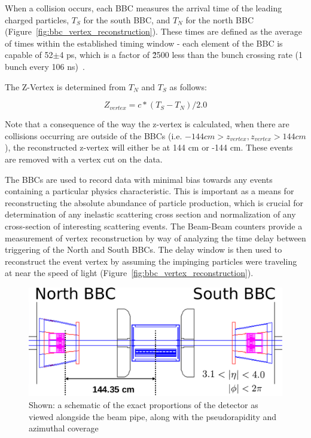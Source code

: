 When a collision occurs, each BBC measures the arrival time of the leading
charged particles, $T_S$ for the south BBC, and $T_N$ for the north BBC
(Figure~\ref{fig:bbc_vertex_reconstruction}). These times are defined as the
average of times within the established timing window - each element of the BBC
is capable of 52$\pm$4 ps, which is a factor of \~2500 less than the bunch
crossing rate (1 bunch every 106 ns)~\cite{Allen2003}.

The Z-Vertex is determined from $T_N$ and $T_S$ as follows:

\begin{equation}
  Z_{vertex} = c * (T_S - T_N) / 2.0
  \label{eq:zvtx_calc}
\end{equation}

{\noindent}Note that a consequence of the way the z-vertex is calculated, when
there are collisions occurring are outside of the BBCs (i.e. $-144 cm >
z_{vertex}, z_{vertex} > 144 cm$), the reconstructed z-vertex will either be at
144 cm or -144 cm.  These events are removed with a vertex cut on the data.

The BBCs are used to record data with minimal bias towards any events
containing a particular physics characteristic. This is important as a means
for reconstructing the absolute abundance of particle production, which is
crucial for determination of any inelastic scattering cross section and
normalization of any cross-section of interesting scattering events.  The
Beam-Beam counters provide a measurement of vertex reconstruction by way of
analyzing the time delay between triggering of the North and South BBCs.  The
delay window is then used to reconstruct the event vertex by assuming the
impinging particles were traveling at near the speed of light
(Figure~\ref{fig:bbc_vertex_reconstruction}). 

\begin{figure}[ht]
  \centering
  \includegraphics[width=\linewidth]{./figures/bbc_overview.pdf}
  \caption{
    Shown: a schematic of the exact proportions of the detector as viewed
    alongside the beam pipe, along with the pseudorapidity and azimuthal
    coverage~\cite{Nakamura2002}
  }
  \label{fig:bbc_overview}
\end{figure}

